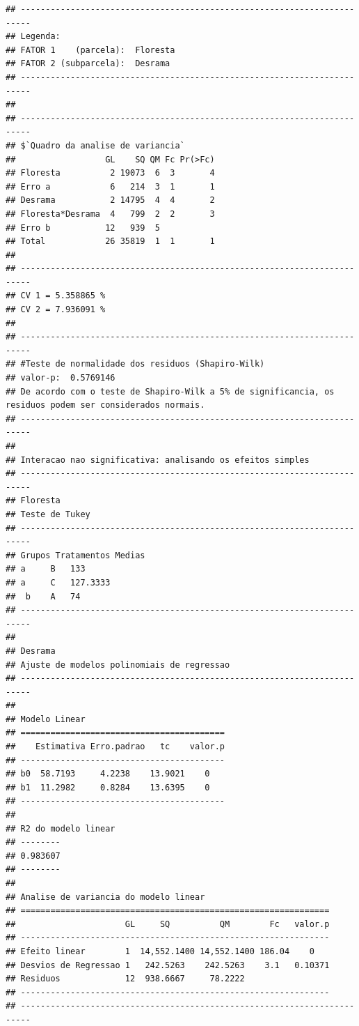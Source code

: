 \documentclass[
]{article}
\begin{document}
\begin{verbatim}
## ------------------------------------------------------------------------
## Legenda:
## FATOR 1    (parcela):  Floresta 
## FATOR 2 (subparcela):  Desrama 
## ------------------------------------------------------------------------
## 
## ------------------------------------------------------------------------
## $`Quadro da analise de variancia`
##                  GL    SQ QM Fc Pr(>Fc)
## Floresta          2 19073  6  3       4
## Erro a            6   214  3  1       1
## Desrama           2 14795  4  4       2
## Floresta*Desrama  4   799  2  2       3
## Erro b           12   939  5           
## Total            26 35819  1  1       1
## 
## ------------------------------------------------------------------------
## CV 1 = 5.358865 %
## CV 2 = 7.936091 %
## 
## ------------------------------------------------------------------------
## #Teste de normalidade dos residuos (Shapiro-Wilk)
## valor-p:  0.5769146 
## De acordo com o teste de Shapiro-Wilk a 5% de significancia, os residuos podem ser considerados normais.
## ------------------------------------------------------------------------
## 
## Interacao nao significativa: analisando os efeitos simples
## ------------------------------------------------------------------------
## Floresta
## Teste de Tukey
## ------------------------------------------------------------------------
## Grupos Tratamentos Medias
## a     B   133 
## a     C   127.3333 
##  b    A   74 
## ------------------------------------------------------------------------
## 
## Desrama
## Ajuste de modelos polinomiais de regressao
## ------------------------------------------------------------------------
## 
## Modelo Linear
## =========================================
##    Estimativa Erro.padrao   tc    valor.p
## -----------------------------------------
## b0  58.7193     4.2238    13.9021    0   
## b1  11.2982     0.8284    13.6395    0   
## -----------------------------------------
## 
## R2 do modelo linear
## --------
## 0.983607
## --------
## 
## Analise de variancia do modelo linear
## ==============================================================
##                      GL     SQ          QM        Fc   valor.p
## --------------------------------------------------------------
## Efeito linear        1  14,552.1400 14,552.1400 186.04    0   
## Desvios de Regressao 1   242.5263    242.5263    3.1   0.10371
## Residuos             12  938.6667     78.2222                 
## --------------------------------------------------------------
## ------------------------------------------------------------------------

\end{verbatim}
\end{document}
